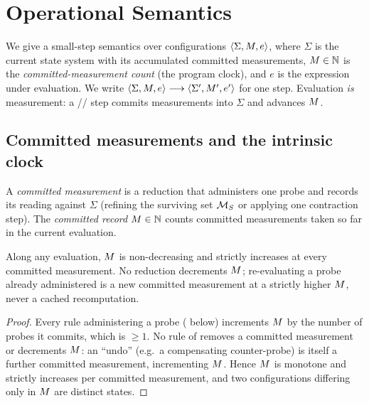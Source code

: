 \section{Operational Semantics}
\label{cfc:sec:opsem}

We give a small-step semantics \citep{plotkin2004structural} over
configurations $\langle\Sigma,M,e\rangle$, where $\Sigma$ is the current
state system with its accumulated committed measurements, $M\in\mathbb{N}$ is the
\emph{committed-measurement count} (the program clock), and $e$ is the
expression under evaluation. We write
$\langle\Sigma,M,e\rangle\longrightarrow\langle\Sigma',M',e'\rangle$ for one
step. Evaluation \emph{is} measurement: a //
step commits measurements into $\Sigma$ and advances $M$.

\subsection{Committed measurements and the intrinsic clock}

\begin{definition}
\label{cfc:def:committed}
A \emph{committed measurement} is a reduction that administers one probe and
records its reading against $\Sigma$ (refining the surviving set $\mathcal{M}_S$ or
applying one contraction step). The \emph{committed record} $M\in\mathbb{N}$ counts
committed measurements taken so far in the current evaluation.
\end{definition}

\begin{theorem}
\label{cfc:thm:monotone}
Along any evaluation, $M$ is non-decreasing and strictly increases at every
committed measurement. No reduction decrements $M$; re-evaluating a probe
already administered is a new committed measurement at a strictly higher $M$,
never a cached recomputation.
\end{theorem}

\begin{proof}
Every rule administering a probe ( below) increments $M$ by the number of probes it commits,
which is $\ge1$. No rule of  removes a committed measurement or
decrements $M$: an ``undo'' (e.g.\ a compensating counter-probe) is itself a
further committed measurement, incrementing $M$. Hence $M$ is monotone and
strictly increases per committed measurement, and two configurations differing
only in $M$ are distinct states.
\end{proof}

